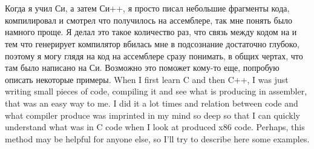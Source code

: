 \documentclass[11pt,a4paper,oneside]{book}
\begin{document}

\mainmatter

\chapter{}

\IFRU
{Когда я учил Си, а затем Си++, я просто писал небольшие фрагменты кода, компилировал и смотрел что 
получилось на ассемблере, так мне понять было намного проще. Я делал это такое количество раз, 
что связь между кодом на \CCpp и тем что генерирует компилятор вбилась мне в подсознание достаточно 
глубоко, поэтому я могу глядя на код на ассемблере сразу понимать, в общих чертах, что там было написано 
на Си. Возможно это поможет кому-то еще, попробую описать некоторые примеры.}
{When I first learn C and then C++, I was just writing small pieces of code, compiling it and see what 
is producing in assembler, that was an easy way to me. I did it a lot times and relation 
between \CCpp code and what compiler produce was imprinted in my mind so deep so that 
I can quickly understand what was in C code when I look at produced x86 code. 
Perhaps, this method may be helpful for anyone else, so I'll try to describe here some examples.}






























\end{document}
